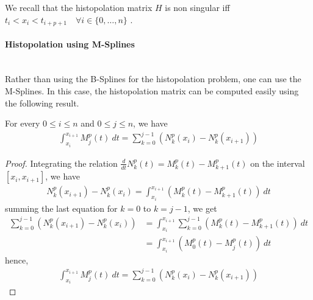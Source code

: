 We recall that the histopolation matrix $H$ is non singular iff  $t_i < x_i < t_{i+p+1} \quad \forall i \in \{ 0, \ldots, n \}$ .

\paragraph{Histopolation using M-Splines} \mbox{}\\
Rather than using the B-Splines for the histopolation problem, one can use the M-Splines. In this case, the histopolation matrix can be computed easily using the following result.
\begin{proposition}
  For every $0 \le i \le  n$ and $0 \le j \le n$, we have
  \begin{align}
    \int_{x_i}^{x_{i+1}} M_j^p(t) ~dt = \sum_{k=0}^{j-1} \left( N_k^p(x_i) - N_k^p(x_{i+1}) \right)  
  \end{align}
\end{proposition}
\begin{proof}
Integrating the relation $\frac{d}{dt}N_k^p(t)=M_k^{p}(t)-M_{k+1}^{p}(t)$ on the interval $[x_i, x_{i+1}]$, we have
\begin{align*}
  N_k^p(x_{i+1}) - N_k^p(x_i) = \int_{x_i}^{x_{i+1}} \left( M_k^{p}(t)-M_{k+1}^{p}(t) \right) ~dt 
\end{align*}
summing the last equation for $k=0$ to $k=j-1$, we get
\begin{align*}
  \sum_{k=0}^{j-1} \left( N_k^p(x_{i+1}) - N_k^p(x_i) \right) 
  &= \int_{x_i}^{x_{i+1}} \sum_{k=0}^{j-1} \left( M_k^{p}(t)-M_{k+1}^{p}(t) \right) ~dt 
  \\
  &= \int_{x_i}^{x_{i+1}} \left( M_0^{p}(t)-M_{j}^{p}(t) \right) ~dt 
\end{align*}
hence,
\begin{align*}
  \int_{x_i}^{x_{i+1}} M_{j}^{p}(t) ~dt = \sum_{k=0}^{j-1} \left( N_k^p(x_{i}) - N_k^p(x_{i+1}) \right) 
\end{align*}
\end{proof}

